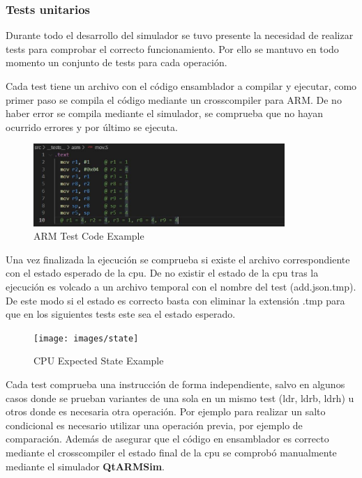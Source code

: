 {        \subsubsection{Tests unitarios}
        Durante todo el desarrollo del simulador se tuvo presente la necesidad de realizar tests
        para comprobar el correcto funcionamiento. Por ello se mantuvo en todo momento un conjunto de tests para cada operación.
        
        Cada test tiene un archivo con el código ensamblador a compilar y ejecutar, como primer paso se compila el código
        mediante un crosscompiler para ARM. De no haber error se compila mediante el simulador, se comprueba que no hayan ocurrido errores y por
        último se ejecuta.

        \begin{figure}[h]
         \centering
            \includegraphics[width=0.85\textwidth]{images/asm}
            \caption{ARM Test Code Example}
        \end{figure}

        \newpage
        Una vez finalizada la ejecución se comprueba si existe el archivo correspondiente con el estado esperado de la cpu.
        De no existir el estado de la cpu tras la ejecución es volcado a un archivo temporal con el nombre del test (add.json.tmp).
        De este modo si el estado es correcto basta con eliminar la extensión .tmp para que en los siguientes tests este sea el estado esperado.
    
        \begin{figure}[h]
         \centering
            \texttt{[image: images/state]}
            \caption{CPU Expected State Example}
        \end{figure}
        
        Cada test comprueba una instrucción de forma independiente, salvo en algunos casos donde se prueban variantes de una sola en un mismo test (ldr, ldrb, ldrh) u otros
        donde es necesaria otra operación. Por ejemplo para realizar un salto condicional es necesario utilizar una operación previa, por ejemplo de comparación.
        Además de asegurar que el código en ensamblador es correcto mediante el crosscompiler el estado final
        de la cpu se comprobó manualmente mediante el simulador \textbf{QtARMSim}.        
    }
    
